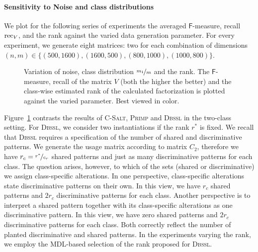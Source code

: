 \paragraph{Sensitivity to Noise and class distributions}
We plot for the following series of experiments the averaged $\mathsf{F}$-measure, recall $\operatorname{rec}_V$, and the rank against the varied data generation parameter. For every experiment, we generate eight matrices: two for each combination of dimensions $(n,m)\in\{(500,1600),\allowbreak(1600,500),\allowbreak(800,1000),\allowbreak(1000,800)\}$.
\begin{figure}[t!]
\centering

\caption{Variation of noise, class distribution $\nicefrac{m_1}{m}$  and the rank. The $\mathsf{F}$-measure, recall of the matrix $V$ (both the higher the better) and the class-wise estimated rank of the calculated factorization is plotted against the varied parameter. Best viewed in color.}
\label{fig:CS:noise}
\end{figure}

Figure~\ref{fig:CS:noise} contrasts the results of \textsc{C-Salt}, \textsc{Primp} and \textsc{Dbssl} in the two-class setting. For \textsc{Dbssl}, we consider two instantiations if the rank $r^*$ is fixed. We recall that \textsc{Dbssl} requires a specification of the number of shared and discriminative patterns. We generate the usage matrix according to matrix $C_2$, therefore we have $r_c=\nicefrac{r^*}{c_r}$ shared patterns and just as many discriminative patterns for each class. The question arises, however, to which of the sets (shared or discriminative) we assign class-specific alterations. In one perspective, class-specific alterations state discriminative patterns on their own. In this view, we have $r_c$ shared patterns and $2r_c$ discriminative patterns for each class. Another perspective is to interpret a shared pattern together with its class-specific alterations as one discriminative pattern. In this view, we have zero shared patterns and $2r_c$ discriminative patterns for each class. Both correctly reflect the number of planted discriminative and shared patterns. In the experiments varying the rank, we employ the MDL-based selection of the rank proposed for \textsc{Dbssl}. %


